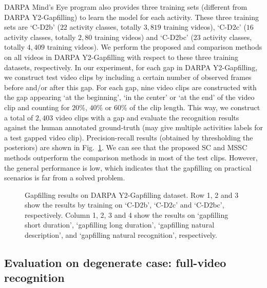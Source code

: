 DARPA Mind's Eye program also provides three training sets (different from
DARPA Y2-Gapfilling) to learn the model for each activity.  These three
training sets are `C-D2b' ($22$ activity classes, totally $3,819$ training
videos), `C-D2c' ($16$ activity classes, totally $2,80$ training videos) and
`C-D2bc' ($23$ activity classes, totally $4,409$ training videos).  We perform
the proposed and comparison methods on all videos in DARPA Y2-Gapfilling with
respect to these three training datasets, respectively. In our experiment, for
each gap in DARPA Y2-Gapfilling, we construct test video clips by including a
certain number of observed frames before and/or after this gap. For each gap,
nine video clips are constructed with the gap appearing `at the beginning', `in
the center' or `at the end' of the video clip and counting for $20\%$, $40\%$
or $60\%$ of the clip length. This way, we construct a total of $2,403$ video
clips with a gap and evaluate the recognition results against the human
annotated ground-truth (may give multiple activities labels for a test gapped
video clip). Precision-recall results (obtained by thresholding the posteriors)
are shown in Fig.~\ref{fig:gapfilling_comparison_multiple_verb}. We can see
that the proposed SC and MSSC methods outperform the comparison methods in most
of the test clips. However, the general performance is low, which indicates
that the gapfilling on practical scenarios is far from a solved problem.

\begin{figure}[htbp]
  \begin{center}
  \end{center}
  \vspace{-4mm}
  \caption{Gapfilling results on DARPA Y2-Gapfilling dataset. Row 1, 2 and 3 show the results by training on `C-D2b',
    `C-D2c' and `C-D2bc', respectively. Column 1, 2, 3 and 4 show the results on `gapfilling short duration', `gapfilling long duration',
    `gapfilling natural description', and `gapfilling natural recognition', respectively.}
  \vspace{-4mm}
  \label{fig:gapfilling_comparison_multiple_verb}
\end{figure}

\subsection{Evaluation on degenerate case: full-video recognition}

